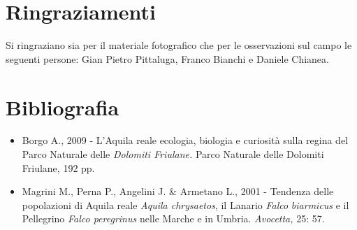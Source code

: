 \section*{Ringraziamenti}
Si ringraziano sia per il materiale fotografico che per le osservazioni
sul campo le seguenti persone: Gian Pietro Pittaluga, Franco Bianchi e
Daniele Chianea.

\section*{Bibliografia}
\begin{itemize}\itemsep0pt
	\item Borgo A., 2009 - L{\textquoteright}Aquila reale ecologia,
biologia e curiosit\`a sulla regina del Parco Naturale delle
\textit{Dolomiti Friulane.} Parco Naturale delle Dolomiti Friulane, 192
pp.

	\item Magrini M., Perna P., Angelini J. \& Armetano L., 2001\textsc{ -
}Tendenza delle popolazioni di Aquila reale \textit{Aquila chrysaetos},
il Lanario \textit{Falco }\textit{biarmicus} e il Pellegrino\textit{
Falco peregrinus }nelle Marche e in Umbria. \textit{Avocetta, }25: 57.
\end{itemize}
